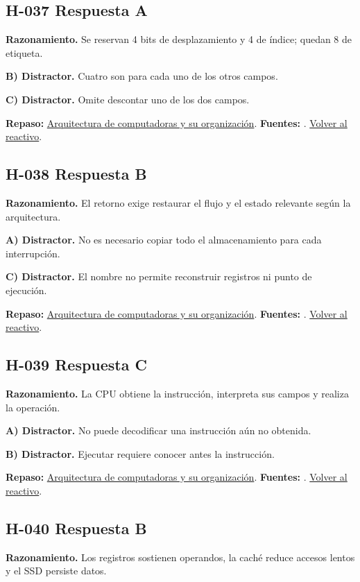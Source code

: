 \subsection*{H-037 \quad Respuesta A}\label{s:H-037}
\textbf{Razonamiento.} Se reservan 4 bits de desplazamiento y 4 de índice; quedan 8 de etiqueta.

\textbf{B) Distractor. }Cuatro son para cada uno de los otros campos.

\textbf{C) Distractor. }Omite descontar uno de los dos campos.

\textbf{Repaso:} \hyperref[sec:h2]{Arquitectura de computadoras y su organización}. \textbf{Fuentes:} \cite{intel,architecture}. \hyperref[q:H-037]{Volver al reactivo}.\par\medskip

\subsection*{H-038 \quad Respuesta B}\label{s:H-038}
\textbf{Razonamiento.} El retorno exige restaurar el flujo y el estado relevante según la arquitectura.

\textbf{A) Distractor. }No es necesario copiar todo el almacenamiento para cada interrupción.

\textbf{C) Distractor. }El nombre no permite reconstruir registros ni punto de ejecución.

\textbf{Repaso:} \hyperref[sec:h2]{Arquitectura de computadoras y su organización}. \textbf{Fuentes:} \cite{intel,architecture}. \hyperref[q:H-038]{Volver al reactivo}.\par\medskip

\subsection*{H-039 \quad Respuesta C}\label{s:H-039}
\textbf{Razonamiento.} La CPU obtiene la instrucción, interpreta sus campos y realiza la operación.

\textbf{A) Distractor. }No puede decodificar una instrucción aún no obtenida.

\textbf{B) Distractor. }Ejecutar requiere conocer antes la instrucción.

\textbf{Repaso:} \hyperref[sec:h2]{Arquitectura de computadoras y su organización}. \textbf{Fuentes:} \cite{intel,architecture}. \hyperref[q:H-039]{Volver al reactivo}.\par\medskip

\subsection*{H-040 \quad Respuesta B}\label{s:H-040}
\textbf{Razonamiento.} Los registros sostienen operandos, la caché reduce accesos lentos y el SSD persiste datos.

